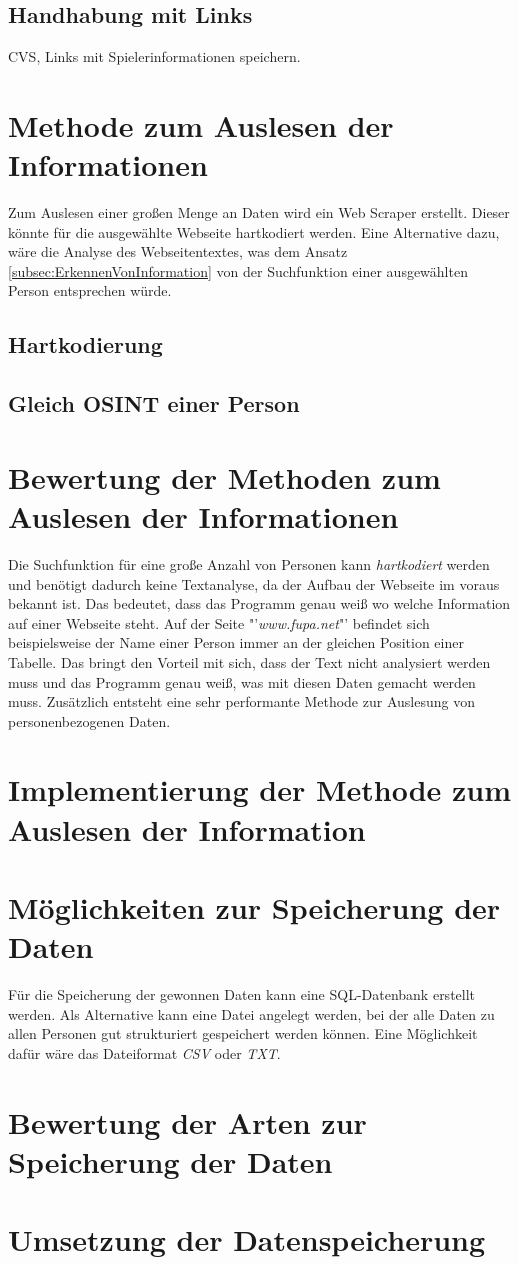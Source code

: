 	\subsection{Handhabung mit Links}
	CVS, Links mit Spielerinformationen speichern.
	
\section{Methode zum Auslesen der Informationen}
Zum Auslesen einer großen Menge an Daten wird ein Web Scraper erstellt. Dieser könnte für die ausgewählte Webseite hartkodiert werden. Eine Alternative dazu, wäre die Analyse des Webseitentextes, was dem Ansatz \ref{subsec:ErkennenVonInformation} von der Suchfunktion einer ausgewählten Person entsprechen würde.
	\subsection{Hartkodierung}
	\subsection{Gleich OSINT einer Person}

\section{Bewertung der Methoden zum Auslesen der Informationen}
Die Suchfunktion für eine große Anzahl von Personen kann \textit{hartkodiert} werden und benötigt dadurch keine Textanalyse, da der Aufbau der Webseite im voraus bekannt ist. Das bedeutet, dass das Programm genau weiß wo welche Information auf einer Webseite steht. Auf der Seite "'\textit{www.fupa.net}"' befindet sich beispielsweise der Name einer Person immer an der gleichen Position einer Tabelle. Das bringt den Vorteil mit sich, dass der Text nicht analysiert werden muss und das Programm genau weiß, was mit diesen Daten gemacht werden muss. Zusätzlich entsteht eine sehr performante Methode zur Auslesung von personenbezogenen Daten.

\section{Implementierung der Methode zum Auslesen der Information}

\section{Möglichkeiten zur Speicherung der Daten}
Für die Speicherung der gewonnen Daten kann eine SQL-Datenbank erstellt werden.
Als Alternative kann eine Datei angelegt werden, bei der alle Daten zu allen Personen gut strukturiert gespeichert werden können. Eine Möglichkeit dafür wäre das Dateiformat \textit{CSV} oder \textit{TXT}.
\section{Bewertung der Arten zur Speicherung der Daten}
\section{Umsetzung der Datenspeicherung}


